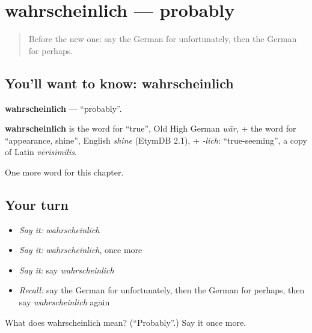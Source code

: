 \section[wahrscheinlich]{wahrscheinlich — probably}

\label{lesson:GE-C172-wahrscheinlich}



\begin{quote}
Before the new one: say the German for unfortunately, then the German for perhaps.
\end{quote}

\subsection*{You'll want to know: wahrscheinlich}
\textbf{wahrscheinlich} — \textquotedblleft{}probably\textquotedblright{}.

\begin{cousinweb}
\textbf{wahrscheinlich} is the word for \textquotedblleft{}true\textquotedblright{}, Old High German \emph{wār}, + the word for \textquotedblleft{}appearance, shine\textquotedblright{}, English \emph{shine} (EtymDB 2.1), + \emph{-lich}: \textquotedblleft{}true-seeming\textquotedblright{}, a copy of Latin \emph{vērisimilis}.
\end{cousinweb}

\begin{grammarlens}[title={What you've built}]
One more word for this chapter.
\end{grammarlens}

\subsection*{Your turn}
\begin{itemize}
\raggedright
  \item \emph{Say it:} \emph{wahrscheinlich}
  \item \emph{Say it:} \emph{wahrscheinlich}, once more
  \item \emph{Say it:} say \emph{wahrscheinlich}
  \item \emph{Recall:} say the German for unfortunately, then the German for perhaps, then say \emph{wahrscheinlich} again
\end{itemize}

\begin{tcolorbox}[breakable,colback=teal!4,colframe=teal!35!black,title={Before you move on}]
What does wahrscheinlich mean? (\textquotedblleft{}Probably\textquotedblright{}.) Say it once more.
\end{tcolorbox}
